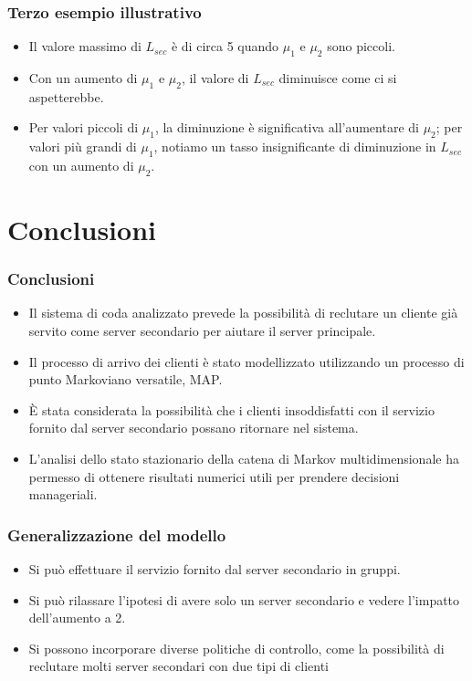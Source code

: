 \documentclass{beamer}
\begin{document}
\begin{frame}
    \frametitle{Terzo esempio illustrativo}

    \begin{itemize}
        \item Il valore massimo di $L_{sec}$ è di circa 5 quando $\mu_1$ e $\mu_2$ sono piccoli.
        \item Con un aumento di $\mu_1$ e $\mu_2$, il valore di $L_{sec}$ diminuisce come ci si aspetterebbe.
        \item Per valori piccoli di $\mu_1$, la diminuzione è significativa all'aumentare di $\mu_2$; per valori più grandi di $\mu_1$, notiamo un tasso insignificante di diminuzione in $L_{sec}$ con un aumento di $\mu_2$.
    \end{itemize}


\end{frame}


\section{Conclusioni}

\begin{frame}
    \frametitle{Conclusioni}
    \begin{itemize}
        \item Il sistema di coda analizzato prevede la possibilità di reclutare un cliente già servito come server secondario per aiutare il server principale.
        \item Il processo di arrivo dei clienti è stato modellizzato utilizzando un processo di punto Markoviano versatile, MAP.
        \item È stata considerata la possibilità che i clienti insoddisfatti con il servizio fornito dal server secondario possano ritornare nel sistema.
        \item L'analisi dello stato stazionario della catena di Markov multidimensionale ha permesso di ottenere risultati numerici utili per prendere decisioni manageriali.
    \end{itemize}
\end{frame}


\begin{frame}
    \frametitle{Generalizzazione del modello}
    \begin{itemize}
        \item Si può effettuare il servizio fornito dal server secondario in gruppi.
        \item Si può rilassare l'ipotesi di avere solo un server secondario e vedere l'impatto dell'aumento a 2.
        \item Si possono incorporare diverse politiche di controllo, come la possibilità di reclutare molti server secondari con due tipi di clienti
    \end{itemize}
\end{frame}
\end{document}

